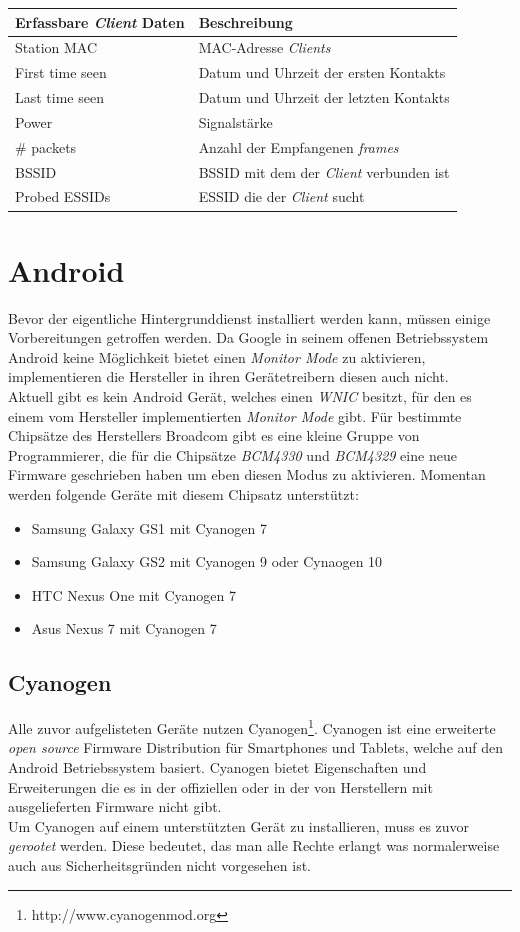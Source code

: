 \documentclass[]{report}
\begin{document}
\begin{center}
  \begin{tabulary}{\textwidth}{l | L}
\toprule
Erfassbare \textit{Client} Daten & Beschreibung \\
\midrule
Station MAC & MAC-Adresse \textit{Clients} \\
First time seen & Datum und Uhrzeit der ersten Kontakts \\
Last time seen & Datum und Uhrzeit der letzten Kontakts \\
Power & Signalstärke \\
\# packets & Anzahl der Empfangenen \textit{frames} \\
BSSID & BSSID mit dem der \textit{Client} verbunden ist \\
Probed ESSIDs & ESSID die der \textit{Client} sucht \\
\bottomrule
\end{tabulary}
\end{center}
\section{Android}
Bevor der eigentliche Hintergrunddienst installiert werden kann, müssen einige Vorbereitungen getroffen werden. Da Google in seinem offenen Betriebssystem Android keine Möglichkeit bietet einen \textit{Monitor Mode} zu aktivieren, implementieren die Hersteller in ihren Gerätetreibern diesen auch nicht.\\
Aktuell gibt es kein Android Gerät, welches einen \textit{WNIC} besitzt, für den es einem vom Hersteller implementierten \textit{Monitor Mode} gibt. Für bestimmte Chipsätze des Herstellers Broadcom gibt es eine kleine Gruppe von Programmierer, die für die Chipsätze \textit{BCM4330} und \textit{BCM4329} eine neue Firmware geschrieben haben um eben diesen Modus zu aktivieren. Momentan werden folgende Geräte mit diesem Chipsatz unterstützt:
\begin{itemize}
\item Samsung Galaxy GS1 mit Cyanogen 7
\item Samsung Galaxy GS2 mit Cyanogen 9 oder Cynaogen 10
\item HTC Nexus One mit Cyanogen 7
\item Asus Nexus 7 mit Cyanogen 7
\end{itemize}
\subsection{Cyanogen}
Alle zuvor aufgelisteten Geräte nutzen Cyanogen\footnote{http://www.cyanogenmod.org}. Cyanogen ist eine erweiterte \textit{open source} Firmware Distribution für Smartphones und Tablets, welche auf den Android Betriebssystem basiert. Cyanogen bietet Eigenschaften und Erweiterungen die es in der offiziellen oder in der von Herstellern mit ausgelieferten Firmware nicht gibt. \\
Um Cyanogen auf einem unterstützten Gerät zu installieren, muss es zuvor \textit{gerootet} werden. Diese bedeutet, das man alle Rechte erlangt was normalerweise auch aus Sicherheitsgründen nicht vorgesehen ist. 
\end{document}
